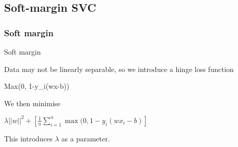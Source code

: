 
\subsection{Soft-margin SVC}

\subsubsection{Soft margin}

Soft margin

Data may not be linearly separable, so we introduce a hinge loss function

Max(0, 1-y_i(wx-b))

We then minimise

\(\lambda ||w||^2+ [\frac{1}{n}\sum_{i=1}^n \max (0, 1-y_i(wx_i-b)]\)

This introduces \(\lambda\) as a parameter.

